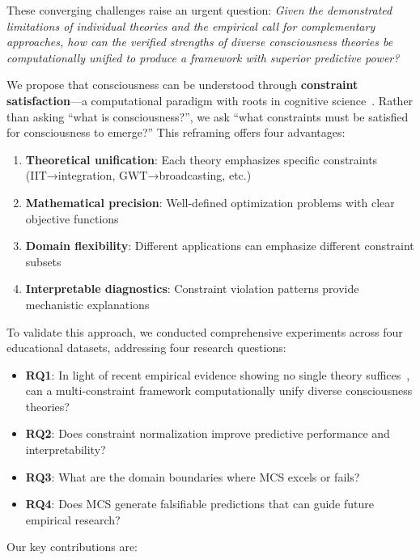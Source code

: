 \documentclass[10pt,journal,compsoc]{IEEEtran}
\begin{document}
These converging challenges raise an urgent question: \textit{Given the demonstrated limitations of individual theories and the empirical call for complementary approaches, how can the verified strengths of diverse consciousness theories be computationally unified to produce a framework with superior predictive power?}

We propose that consciousness can be understood through \textbf{constraint satisfaction}—a computational paradigm with roots in cognitive science~\cite{thagard1998,rumelhart1986}. Rather than asking ``what is consciousness?'', we ask ``what constraints must be satisfied for consciousness to emerge?'' This reframing offers four advantages:

\begin{enumerate}
    \item \textbf{Theoretical unification}: Each theory emphasizes specific constraints (IIT→integration, GWT→broadcasting, etc.)
    \item \textbf{Mathematical precision}: Well-defined optimization problems with clear objective functions
    \item \textbf{Domain flexibility}: Different applications can emphasize different constraint subsets
    \item \textbf{Interpretable diagnostics}: Constraint violation patterns provide mechanistic explanations
\end{enumerate}

To validate this approach, we conducted comprehensive experiments across four educational datasets, addressing four research questions:

\begin{itemize}
    \item \textbf{RQ1}: In light of recent empirical evidence showing no single theory suffices~\cite{Melloni2025}, can a multi-constraint framework computationally unify diverse consciousness theories?
    \item \textbf{RQ2}: Does constraint normalization improve predictive performance and interpretability?
    \item \textbf{RQ3}: What are the domain boundaries where MCS excels or fails?
    \item \textbf{RQ4}: Does MCS generate falsifiable predictions that can guide future empirical research?
\end{itemize}

Our key contributions are:
\end{document}
